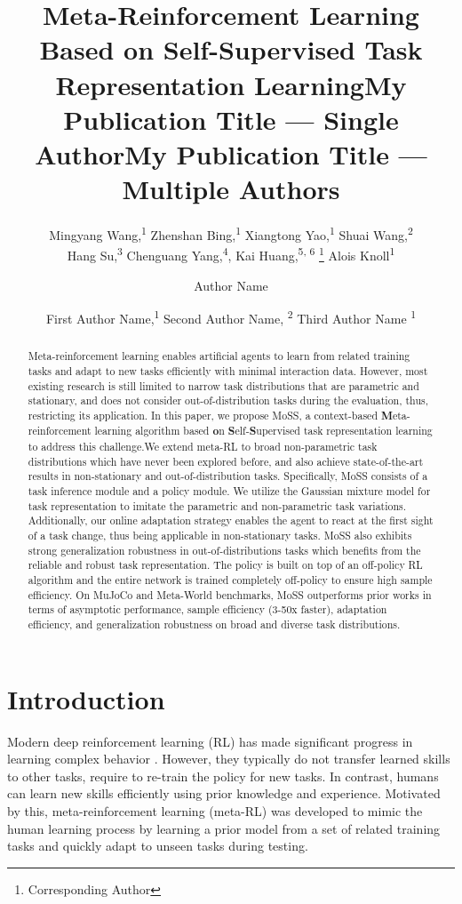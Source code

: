 \documentclass[letterpaper]{article} %
\title{Meta-Reinforcement Learning Based on Self-Supervised Task Representation Learning}
\author{
    Mingyang Wang,\textsuperscript{\rm 1} Zhenshan Bing,\textsuperscript{\rm 1} Xiangtong Yao,\textsuperscript{\rm 1} Shuai Wang,\textsuperscript{\rm 2} \\
    Hang Su,\textsuperscript{\rm 3} Chenguang Yang,\textsuperscript{\rm 4}, Kai Huang,\textsuperscript{\rm 5, 6} \thanks{Corresponding Author} Alois Knoll\textsuperscript{\rm 1} 
}
\title{My Publication Title --- Single Author}
\author {
    Author Name
}
\title{My Publication Title --- Multiple Authors}
\author {
    First Author Name,\textsuperscript{\rm 1}
    Second Author Name, \textsuperscript{\rm 2}
    Third Author Name \textsuperscript{\rm 1}
}
\begin{document}
\maketitle

\begin{abstract}
Meta-reinforcement learning enables artificial agents to learn from related training tasks and adapt to new tasks efficiently with minimal interaction data. However, most existing research is still limited to narrow task distributions that are parametric and stationary, and does not consider out-of-distribution tasks during the evaluation, thus, restricting its application. In this paper, we propose MoSS, a context-based \textbf{M}eta-reinforcement learning algorithm based \textbf{o}n \textbf{S}elf-\textbf{S}upervised task representation learning to address this challenge.We extend meta-RL to broad non-parametric task distributions which have never been explored before, and also achieve state-of-the-art results in non-stationary and out-of-distribution tasks. Specifically, MoSS consists of a task inference module and a policy module. We utilize the Gaussian mixture model for task representation to imitate the parametric and non-parametric task variations. Additionally, our online adaptation strategy enables the agent to react at the first sight of a task change, thus being applicable in non-stationary tasks. MoSS also exhibits strong generalization robustness in out-of-distributions tasks which benefits from the reliable and robust task representation. The policy is built on top of an off-policy RL algorithm and the entire network is trained completely off-policy to ensure high sample efficiency. On MuJoCo and Meta-World benchmarks, MoSS outperforms prior works in terms of asymptotic performance, sample efficiency (3-50x faster), adaptation efficiency, and generalization robustness on broad and diverse task distributions.
\end{abstract}
\section{Introduction}
Modern deep reinforcement learning (RL) has made significant progress in learning complex behavior \cite{Mnih2015, AlphaGO, AlphaZERO, HGG}. However, they typically do not transfer learned skills to other tasks, require to re-train the policy for new tasks. In contrast, humans can learn new skills efficiently using prior knowledge and experience. Motivated by this, meta-reinforcement learning (meta-RL) was developed to mimic the human learning process by learning a prior model from a set of related training tasks and quickly adapt to unseen tasks during testing.
\end{document}
